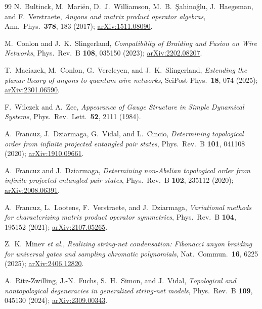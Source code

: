 \documentclass[aps,pra,twocolumn,superscriptaddress,longbibliography,floatfix,nofootinbib]{revtex4-2}
\begin{document}
\begin{thebibliography}{99}
N.~Bultinck, M.~Mari\"en, D.~J.~Williamson, M.~B.~\c{S}ahino\u{g}lu,
J.~Haegeman, and F.~Verstraete,
\emph{Anyons and matrix product operator algebras},
Ann.\ Phys.\ \textbf{378}, 183 (2017);
\href{https://arxiv.org/abs/1511.08090}{arXiv:1511.08090}.

M.~Conlon and J.~K.~Slingerland,
\emph{Compatibility of Braiding and Fusion on Wire Networks},
Phys.\ Rev.\ B \textbf{108}, 035150 (2023);
\href{https://arxiv.org/abs/2202.08207}{arXiv:2202.08207}.

T.~Maciazek, M.~Conlon, G.~Vercleyen, and J.~K.~Slingerland,
\emph{Extending the planar theory of anyons to quantum wire networks},
SciPost Phys.\ \textbf{18}, 074 (2025);
\href{https://arxiv.org/abs/2301.06590}{arXiv:2301.06590}.

F.~Wilczek and A.~Zee,
\emph{Appearance of Gauge Structure in Simple Dynamical Systems},
Phys.\ Rev.\ Lett.\ \textbf{52}, 2111 (1984).

A.~Francuz, J.~Dziarmaga, G.~Vidal, and L.~Cincio,
\emph{Determining topological order from infinite projected entangled pair
states},
Phys.\ Rev.\ B \textbf{101}, 041108 (2020);
\href{https://arxiv.org/abs/1910.09661}{arXiv:1910.09661}.

A.~Francuz and J.~Dziarmaga,
\emph{Determining non-Abelian topological order from infinite projected
entangled pair states},
Phys.\ Rev.\ B \textbf{102}, 235112 (2020);
\href{https://arxiv.org/abs/2008.06391}{arXiv:2008.06391}.

A.~Francuz, L.~Lootens, F.~Verstraete, and J.~Dziarmaga,
\emph{Variational methods for characterizing matrix product operator
symmetries},
Phys.\ Rev.\ B \textbf{104}, 195152 (2021);
\href{https://arxiv.org/abs/2107.05265}{arXiv:2107.05265}.

Z.~K.~Minev \emph{et al.},
\emph{Realizing string-net condensation: Fibonacci anyon braiding for universal
gates and sampling chromatic polynomials},
Nat.\ Commun.\ \textbf{16}, 6225 (2025);
\href{https://arxiv.org/abs/2406.12820}{arXiv:2406.12820}.

A.~Ritz-Zwilling, J.-N.~Fuchs, S.~H.~Simon, and J.~Vidal,
\emph{Topological and nontopological degeneracies in generalized string-net
models},
Phys.\ Rev.\ B \textbf{109}, 045130 (2024);
\href{https://arxiv.org/abs/2309.00343}{arXiv:2309.00343}.


\end{thebibliography}
\end{document}
